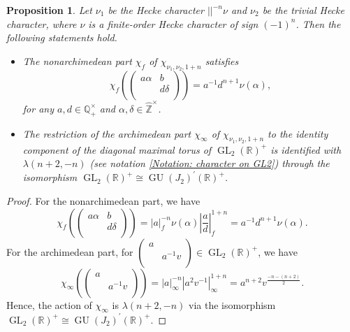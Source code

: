 \documentclass[11pt, a4paper]{amsart}
\theoremstyle{plain}
\newtheorem{proposition}[theorem]{Proposition}
\theoremstyle{definition}
\numberwithin{equation}{section}
\def\QQ{\mathbb{Q}}
\def\RR{\mathbb{R}}
\def\ZZ{\mathbb{Z}}
\DeclareMathOperator{\GU}{GU}
\DeclareMathOperator{\GL}{\mathrm{GL}}
\begin{document}
\begin{proposition}
\label{Prop: choice of v1,v2}
    Let $\nu_1$ be the Hecke character  $||^{-n}\nu$ and $\nu_2$ be the trivial Hecke character, where $\nu$ is a finite-order Hecke character of sign $(-1)^n$. Then the following statements hold.
    \begin{itemize}
        \item The nonarchimedean part $\chi_{f}$ of $\chi_{\nu_1, \nu_2, 1 + n}$ satisfies 
        \begin{equation*}
            \chi_{f}(\begin{pmatrix}
                        a\alpha & b \\
                                & d\delta \\
                    \end{pmatrix}) = a^{-1}d^{n + 1} \nu(\alpha), 
        \end{equation*}
        for any $a, d \in \QQ_{+}^{\times}$ and $\alpha, \delta \in \widehat{\ZZ}^{\times}$. 
        \item The restriction of the archimedean part $\chi_{\infty}$ of $\chi_{\nu_1, \nu_2, 1 + n}$ to the identity component of the diagonal maximal torus of $\GL_2(\RR)^{+}$ is identified with $\lambda(n + 2, -n)$ (see notation \ref{Notation: character on GL2}) through the isomorphism $\GL_2(\RR)^{+} \cong \GU({J_2})^{\prime}(\RR)^{+}$. 
    \end{itemize}
\end{proposition}

\begin{proof}
    For the nonarchimedean part, we have 
    \begin{equation*}
         \chi_{f}(\begin{pmatrix}
                        a\alpha & b \\
                                & d\delta \\
                    \end{pmatrix}) = |a|_{f}^{-n}\nu(\alpha) |\frac{a}{d}|_{f}^{1 + n} = a^{-1}d^{n + 1} \nu(\alpha).
    \end{equation*}
    For the archimedean part, for $\begin{pmatrix}
                                     a & \\
                                       & a^{-1}v \\
                                  \end{pmatrix} \in \GL_2(\RR)^{+}$, 
    we have 
    \begin{equation*}
        \chi_{\infty}(\begin{pmatrix}
                        a &  \\
                                & a^{-1}v \\
                    \end{pmatrix}) = |a|_{\infty}^{-n}|a^{2}v^{-1}|_{\infty}^{1 + n} = a^{n + 2} v^{\frac{-n - (n + 2)}{2}}.
    \end{equation*}
    Hence, the action of $\chi_{\infty}$ is $\lambda(n + 2, -n)$ via the isomorphism $\GL_2(\RR)^{+} \cong \GU({J_2})^{\prime}(\RR)^{+}$. 
\end{proof}
\end{document}
